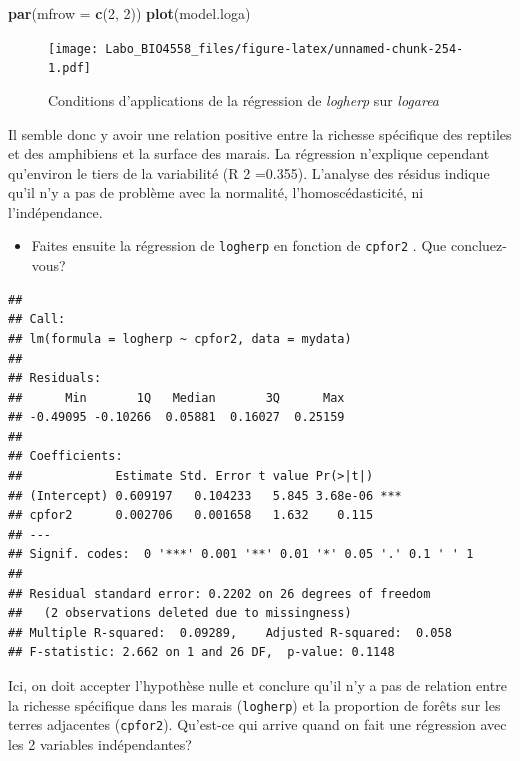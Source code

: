 \documentclass[
  12pt,
]{book}
\newenvironment{Shaded}{\begin{snugshade}}{\end{snugshade}}
\newcommand{\DataTypeTok}[1]{\textcolor[rgb]{0.13,0.29,0.53}{#1}}
\newcommand{\DecValTok}[1]{\textcolor[rgb]{0.00,0.00,0.81}{#1}}
\newcommand{\KeywordTok}[1]{\textcolor[rgb]{0.13,0.29,0.53}{\textbf{#1}}}
\newcommand{\NormalTok}[1]{#1}
\providecommand{\tightlist}{%
  \setlength{\itemsep}{0pt}\setlength{\parskip}{0pt}}
\begin{document}
\begin{Shaded}
\begin{Highlighting}[]
\KeywordTok{par}\NormalTok{(}\DataTypeTok{mfrow =} \KeywordTok{c}\NormalTok{(}\DecValTok{2}\NormalTok{, }\DecValTok{2}\NormalTok{))}
\KeywordTok{plot}\NormalTok{(model.loga)}
\end{Highlighting}
\end{Shaded}

\begin{figure}
\centering
\texttt{[image: Labo\_BIO4558\_files/figure-latex/unnamed-chunk-254-1.pdf]}
\caption{\label{fig:unnamed-chunk-254}Conditions d'applications de la régression de \emph{logherp} sur \emph{logarea}}
\end{figure}

Il semble donc y avoir une relation positive entre la richesse spécifique des reptiles et des amphibiens et la surface des marais. La régression n'explique cependant qu'environ le tiers de la variabilité (R 2 =0.355). L'analyse des résidus indique qu'il n'y a pas de problème avec la normalité, l'homoscédasticité, ni l'indépendance.

\begin{itemize}
\tightlist
\item
  Faites ensuite la régression de \texttt{logherp} en fonction de \texttt{cpfor2} . Que concluez-vous?
\end{itemize}

\begin{verbatim}
## 
## Call:
## lm(formula = logherp ~ cpfor2, data = mydata)
## 
## Residuals:
##      Min       1Q   Median       3Q      Max 
## -0.49095 -0.10266  0.05881  0.16027  0.25159 
## 
## Coefficients:
##             Estimate Std. Error t value Pr(>|t|)    
## (Intercept) 0.609197   0.104233   5.845 3.68e-06 ***
## cpfor2      0.002706   0.001658   1.632    0.115    
## ---
## Signif. codes:  0 '***' 0.001 '**' 0.01 '*' 0.05 '.' 0.1 ' ' 1
## 
## Residual standard error: 0.2202 on 26 degrees of freedom
##   (2 observations deleted due to missingness)
## Multiple R-squared:  0.09289,    Adjusted R-squared:  0.058 
## F-statistic: 2.662 on 1 and 26 DF,  p-value: 0.1148
\end{verbatim}

Ici, on doit accepter l'hypothèse nulle et conclure qu'il n'y a pas de relation entre la richesse spécifique dans les marais (\texttt{logherp}) et la proportion de forêts sur les terres adjacentes (\texttt{cpfor2}). Qu'est-ce qui arrive quand on fait une régression avec les 2 variables indépendantes?
\end{document}

